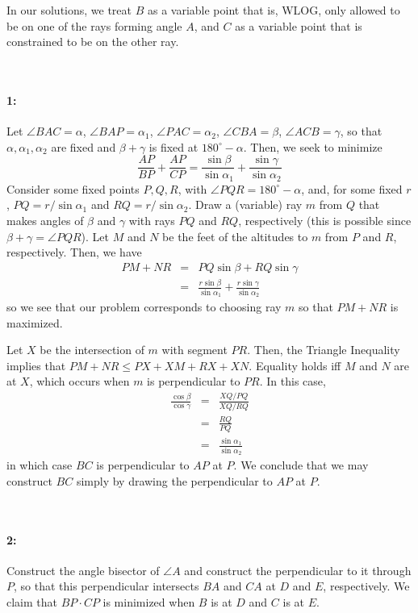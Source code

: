 \begin{mdsoln}
    \begin{note*}
        In our solutions, we treat $B$ as a variable point that is, WLOG, only allowed to be on one of the rays forming angle $A$, and $C$ as a variable point that is constrained to be on the other ray.
    \end{note*}

~\paragraph{1:}
Let $\angle BAC=\alpha$, $\angle BAP=\alpha_1$, $\angle PAC=\alpha_2$, $\angle CBA=\beta$, $\angle ACB=\gamma$, so that $\alpha,\alpha_1,\alpha_2$ are fixed and $\beta+\gamma$ is fixed at $180^\circ-\alpha$. Then, we seek to minimize$$\frac{AP}{BP}+\frac{AP}{CP}=\frac{\sin\beta}{\sin\alpha_1}+\frac{\sin\gamma}{\sin\alpha_2}$$
Consider some fixed points $P,Q,R$, with $\angle PQR=180^\circ-\alpha$, and, for some fixed $r$, $PQ=r/\sin\alpha_1$ and $RQ=r/\sin\alpha_2$. Draw a (variable) ray $m$ from $Q$ that makes angles of $\beta$ and $\gamma$ with rays $PQ$ and $RQ$, respectively (this is possible since $\beta+\gamma=\angle PQR$). Let $M$ and $N$ be the feet of the altitudes to $m$ from $P$ and $R$, respectively. Then, we have\begin{eqnarray*}PM+NR&=&PQ\sin\beta+RQ\sin\gamma\\ &=&\frac{r\sin\beta}{\sin\alpha_1}+\frac{r\sin\gamma}{\sin\alpha_2}\end{eqnarray*}so we see that our problem corresponds to choosing ray $m$ so that $PM+NR$ is maximized.

Let $X$ be the intersection of $m$ with segment $PR$. Then, the Triangle Inequality implies that $PM+NR\le PX+XM+RX+XN$. Equality holds iff $M$ and $N$ are at $X$, which occurs when $m$ is perpendicular to $PR$. In this case,\begin{eqnarray*}\frac{\cos\beta}{\cos\gamma}&=&\frac{XQ/PQ}{XQ/RQ}\\ &=&\frac{RQ}{PQ}\\ &=&\frac{\sin\alpha_1}{\sin\alpha_2}\end{eqnarray*}in which case $BC$ is perpendicular to $AP$ at $P$. We conclude that we may construct $BC$ simply by drawing the perpendicular to $AP$ at $P$.

~\paragraph{2:}
Construct the angle bisector of $\angle A$ and construct the perpendicular to it through $P$, so that this perpendicular intersects $BA$ and $CA$ at $D$ and $E$, respectively. We claim that $BP\cdot CP$ is minimized when $B$ is at $D$ and $C$ is at $E$.


\end{mdsoln}
